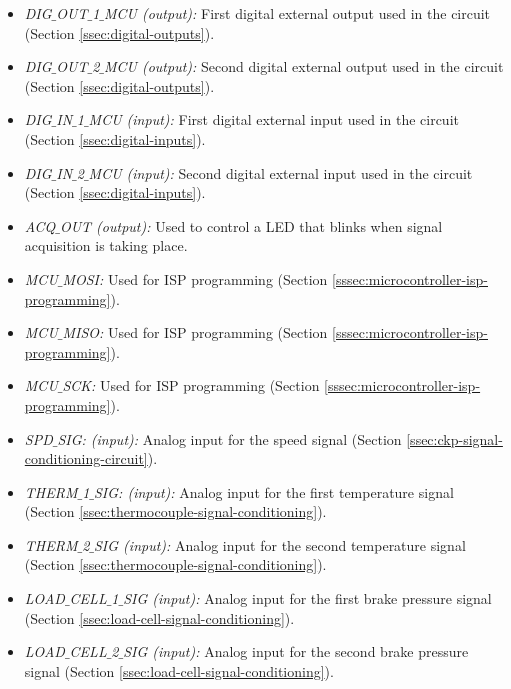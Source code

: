\begin{itemize}
					\item \textit{DIG$\_$OUT$\_$1$\_$MCU (output):} First digital external output used in the circuit (Section \ref{ssec:digital-outputs}).\label{itm:mcu-port-dig-out-1-mcu}
					\item \textit{DIG$\_$OUT$\_$2$\_$MCU (output):} Second digital external output used in the circuit (Section \ref{ssec:digital-outputs}).\label{itm:mcu-port-dig-out-2-mcu}
					\item \textit{DIG$\_$IN$\_$1$\_$MCU (input):} First digital external input used in the circuit (Section \ref{ssec:digital-inputs}).\label{itm:mcu-port-dig-in-1-mcu}
					\item \textit{DIG$\_$IN$\_$2$\_$MCU (input):} Second digital external input used in the circuit (Section \ref{ssec:digital-inputs}).\label{itm:mcu-port-dig-in-2-mcu} 
					\item \textit{ACQ$\_$OUT (output):} Used to control a LED that blinks when signal acquisition is taking place.\label{itm:mcu-port-acq-out}   
					\item \textit{MCU$\_$MOSI:} Used for ISP programming (Section \ref{sssec:microcontroller-isp-programming}).\label{itm:mcu-port-mcu-mosi}
					\item \textit{MCU$\_$MISO:} Used for ISP programming (Section \ref{sssec:microcontroller-isp-programming}).\label{itm:mcu-port-mcu-miso}
					\item \textit{MCU$\_$SCK:} Used for ISP programming (Section \ref{sssec:microcontroller-isp-programming}).\label{itm:mcu-port-mcu-sck}
					\item \textit{SPD$\_$SIG: (input):} Analog input for the speed signal (Section \ref{ssec:ckp-signal-conditioning-circuit}).\label{itm:mcu-port-spd-sig}
					\item \textit{THERM$\_$1$\_$SIG: (input):} Analog input for the first temperature signal (Section \ref{ssec:thermocouple-signal-conditioning}).\label{itm:mcu-port-therm-1-sig}
					\item \textit{THERM$\_$2$\_$SIG (input):} Analog input for the second temperature signal (Section \ref{ssec:thermocouple-signal-conditioning}).\label{itm:mcu-port-therm-2-sig}
					\item \textit{LOAD$\_$CELL$\_$1$\_$SIG (input):} Analog input for the first brake pressure signal (Section \ref{ssec:load-cell-signal-conditioning}).\label{itm:mcu-port-load-cell-1-sig}  
					\item \textit{LOAD$\_$CELL$\_$2$\_$SIG (input):} Analog input for the second brake pressure signal (Section \ref{ssec:load-cell-signal-conditioning}).\label{itm:mcu-port-load-cell-2-sig} 

\end{itemize}
